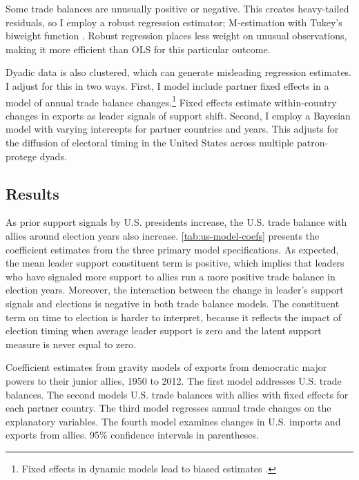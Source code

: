 \documentclass[12pt]{article}
\begin{document}
Some trade balances are unusually positive or negative. 
This creates heavy-tailed residuals, so I employ a robust regression estimator; M-estimation with Tukey's biweight function \citep{RaineyBaissa2020}.
Robust regression places less weight on unusual observations, making it more efficient than OLS for this particular outcome.


Dyadic data is also clustered, which can generate misleading regression estimates.
I adjust for this in two ways. 
First, I model include partner fixed effects in a model of annual trade balance changes.\footnote{Fixed effects in dynamic models lead to biased estimates \citep{Nickell1981}.}
Fixed effects estimate within-country changes in exports as leader signals of support shift.
Second, I employ a Bayesian model with varying intercepts for partner countries and years. 
This adjusts for the diffusion of electoral timing in the United States across multiple patron-protege dyads.




\subsection{Results}


As prior support signals by U.S. presidents increase, the U.S. trade balance with allies around election years also increase. 
\autoref{tab:us-model-coefs} presents the coefficient estimates from the three primary model specifications.
As expected, the mean leader support constituent term is positive, which implies that leaders who have signaled more support to allies run a more positive trade balance in election years. 
Moreover, the interaction between the change in leader's support signals and elections is negative in both trade balance models.
The constituent term on time to election is harder to interpret, because it reflects the impact of election timing when average leader support is zero and the latent support measure is never equal to zero. 


\begin{table}
  \resizebox{.95\textwidth}{!}{
\centering

}
\caption{Coefficient estimates from gravity models of exports from democratic major powers to their junior allies, 1950 to 2012. The first model addresses U.S. trade balances. The second models U.S. trade balances with allies with fixed effects for each partner country. The third model regresses annual trade changes on the explanatory variables. The fourth model examines changes in U.S. imports and exports from allies. 95\% confidence intervals in parentheses.}
\label{tab:us-model-coefs}
\end{table}
\end{document}
